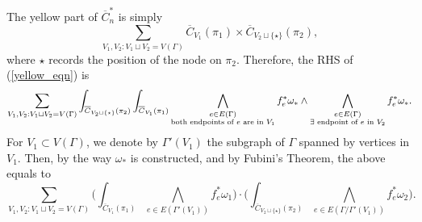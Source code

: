 \documentclass[11pt]{article}
\theoremstyle{definition}
\theoremstyle{remark}
\def\ov#1{\overline{#1}}
\def\tn#1{\textnormal{#1}}
\begin{document}
The yellow part of $\ov{C}^*_n$ is simply
$$\sum_{V_1,V_2:V_1\sqcup V_2=V(\Gamma)}
\ov{C}_{V_1}(\pi_1)\times\ov{C}_{V_2\sqcup\{\star\}}(\pi_2),
$$
where $\star$ records the position of the node on $\pi_2$.
Therefore, the RHS of (\ref{yellow_eqn}) is
$$\sum_{V_1,V_2:V_1\sqcup V_2=V(\Gamma)}
\int_{\ov{C}_{V_2\sqcup\{\star\}}(\pi_2)}\int_{\ov{C}_{V_1}(\pi_1)}
\bigwedge_{\begin{subarray}{c}e\in E(\Gamma)\\\tn{both endpoints of }e\tn{ are in }V_1\end{subarray}}f_e^*{\omega_*}\wedge
\bigwedge_{\begin{subarray}{c}e\in E(\Gamma)\\ \exists\tn{ endpoint of }e\tn{ in }V_2\end{subarray}}f_e^*{\omega_*}. 
$$ 
For $V_1\subset V(\Gamma)$, we denote by $\Gamma'(V_1)$ the subgraph of $\Gamma$ spanned by vertices in $V_1$. Then, by the way $\omega_*$ is constructed, and by Fubini's Theorem, 
the above equals to 
$$\sum_{V_1,V_2:V_1\sqcup V_2=V(\Gamma)}
\Big(\int_{\ov{C}_{V_1}(\pi_1)}
\bigwedge_{e\in E(\Gamma'(V_1))} 
f_e^*{\omega_1}\Big)
\cdot
\Big(\int_{\ov{C}_{V_2\sqcup\{\star\}}(\pi_2)}
\bigwedge_{e\in E(\Gamma/\Gamma'(V_1))}
f_e^*{\omega_2}\Big). 
$$ 
\end{document}
